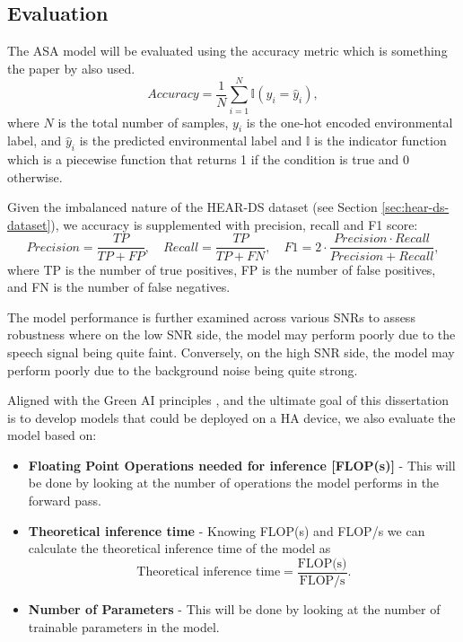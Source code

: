 \documentclass[logo,bsc,singlespacing,parskip,online]{infthesis}
\begin{document}
\subsection{Evaluation}
The ASA model will be evaluated using the accuracy metric which is something the paper by \citet{Huwel2020HearDS} also used.
\[
Accuracy = \frac{1}{N} \sum_{i=1}^{N} \mathbb{I}(y_i = \hat{y}_i),
\]
where \(N\) is the total number of samples, \(y_i\) is the one-hot encoded environmental label, and \(\hat{y}_i\) is the predicted environmental label
and \(\mathbb{I}\) is the indicator function which is a piecewise function that returns 1 if the condition is true and 0 otherwise.

Given the imbalanced nature of the HEAR-DS dataset (see Section \ref{sec:hear-ds-dataset}),
we accuracy is supplemented with precision, recall and F1 score:
\[
Precision = \frac{TP}{TP + FP}, \quad Recall = \frac{TP}{TP + FN}, \quad F1 = 2 \cdot \frac{Precision \cdot Recall}{Precision + Recall},
\]
where TP is the number of true positives, FP is the number of false positives, and FN is the number of false negatives.

The model performance is further examined across various SNRs to assess robustness
where on the low SNR side, the model may perform poorly due to the speech signal being quite faint. 
Conversely, on the high SNR side, the model may perform poorly due to the background noise being quite strong. 


Aligned with the Green AI principles \citep{schwartz2019greenai}, and the ultimate goal of this 
dissertation is to develop models that could be deployed on a HA device, we also evaluate the model 
based on: 
\begin{itemize}
   \item \textbf{Floating Point Operations needed for inference [FLOP(s)]} - This will be done by looking at the number of operations the model performs in the forward pass.
   \item \textbf{Theoretical inference time} - Knowing FLOP(s) and FLOP/s we can calculate the theoretical inference time of the model as 
   \begin{equation}
   \text{Theoretical inference time} = \frac{\text{FLOP(s)}}{\text{FLOP/s}}.
   \label{eq:inference-time}
   \end{equation}
   \item \textbf{Number of Parameters} - This will be done by looking at the number of trainable parameters in the model.
\end{itemize}
\end{document}

